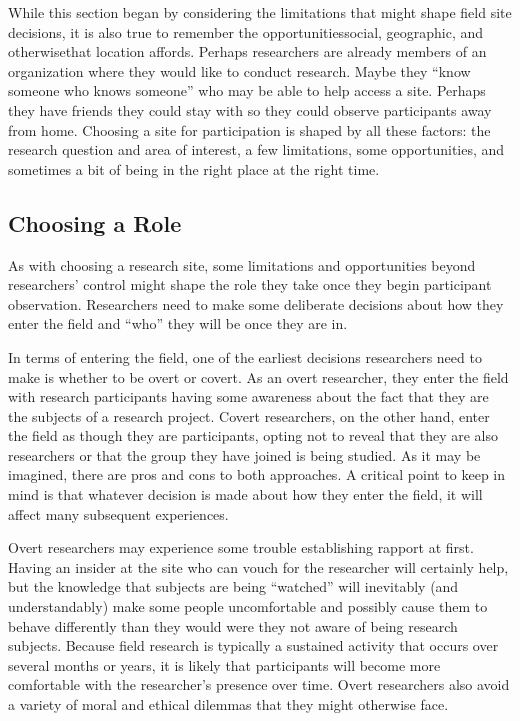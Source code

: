 While this section began by considering the limitations that might shape field site decisions, it is also true to remember the opportunities\textemdash social, geographic, and otherwise\textemdash that location affords. Perhaps researchers are already members of an organization where they would like to conduct research. Maybe they ``know someone who knows someone'' who may be able to help access a site. Perhaps they have friends they could stay with so they could observe participants away from home. Choosing a site for participation is shaped by all these factors: the research question and area of interest, a few limitations, some opportunities, and sometimes a bit of being in the right place at the right time.

\subsection{Choosing a Role}

As with choosing a research site, some limitations and opportunities beyond researchers' control might shape the role they take once they begin participant observation. Researchers need to make some deliberate decisions about how they enter the field and ``who'' they will be once they are in.

In terms of entering the field, one of the earliest decisions researchers need to make is whether to be overt or covert. As an overt researcher, they enter the field with research participants having some awareness about the fact that they are the subjects of a research project. Covert researchers, on the other hand, enter the field as though they are participants, opting not to reveal that they are also researchers or that the group they have joined is being studied. As it may be imagined, there are pros and cons to both approaches. A critical point to keep in mind is that whatever decision is made about how they enter the field, it will affect many subsequent experiences.

Overt researchers may experience some trouble establishing rapport at first. Having an insider at the site who can vouch for the researcher will certainly help, but the knowledge that subjects are being ``watched'' will inevitably (and understandably) make some people uncomfortable and possibly cause them to behave differently than they would were they not aware of being research subjects. Because field research is typically a sustained activity that occurs over several months or years, it is likely that participants will become more comfortable with the researcher's presence over time. Overt researchers also avoid a variety of moral and ethical dilemmas that they might otherwise face. 

